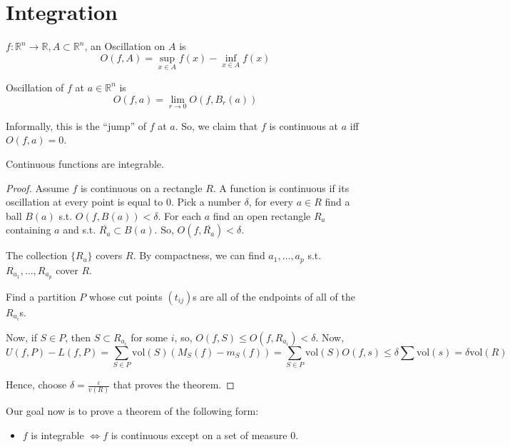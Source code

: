 \documentclass[a4paper]{article}
\numberwithin{equation}{section}
\newcommand{\R}{\mathbb{R}}
\begin{document}
\section{Integration}
\begin{definition}[Oscillation]
    $f:\R^n\to\R, A\subset\R^n$, an Oscillation on $A$ is 
    \begin{equation}
        O(f,A)=\sup_{x\in A}f(x)-\inf_{x\in A}f(x)
    \end{equation}

    Oscillation of $f$ at $a\in\R^n$ is
    \begin{equation}
        O(f,a)=\lim_{r\to0}O(f,B_r(a))
    \end{equation}

    Informally, this is the ``jump'' of $f$ at $a$. So, we claim that $f$ is continuous at $a$ iff $O(f,a)=0$. 
\end{definition}

\begin{theorem}
    Continuous functions are integrable.
    \begin{proof}
       Assume $f$ is continuous on a rectangle $R$. A function is continuous if its oscillation at every point is equal to 0. Pick a number $\delta$, for every $a\in R$ find a ball $B(a)$ s.t. $O(f,B(a))<\delta$. For each $a$ find an open rectangle $R_a$ containing $a$ and s.t. $\overline{R_a}\subset B(a)$. So, $O(f,\overline{R_a})<\delta$.

       The collection $\{R_a\}$ covers $R$. By compactness, we can find $a_1,\dots,a_p$ s.t. $R_{a_1},\dots,R_{a_p}$ cover $R$.

       Find a partition $P$ whose cut points $(t_{ij})$s are all of the endpoints of all of the $R_{a_i}$s. 
       
        Now, if $S\in P$, then $S\subset R_{a_i}$ for some $i$, so, $O(f,S)\leq O(f,R_{a_i})<\delta$. Now, 
        \begin{equation}
            U(f,P)-L(f,P)=\sum_{S\in P}\mathrm{vol}(S)(M_S(f)-m_S(f))=\sum_{S\in P}\mathrm{vol}(S)O(f,s)\leq\delta\sum\mathrm{vol}(s)=\delta\mathrm{vol}(R)
        \end{equation}

        Hence, choose $\delta=\frac{\varepsilon}{v(R)}$ that proves the theorem.
    \end{proof}
\end{theorem}

Our goal now is to prove a theorem of the following form:
\begin{itemize}
    \item $f$ is integrable $\iff f$ is continuous except on a  set of measure 0.
\end{itemize}
\end{document}
